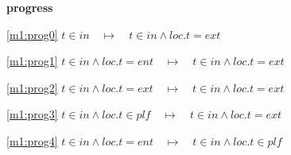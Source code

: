 \textbf{progress}
\begin{block}
\item[ \eqref{m1:prog0} ]$t \in in  \quad \mapsto\quad t \in in \land loc.t = ext $ %
\item[ \eqref{m1:prog1} ]$t \in in \land loc.t = ent  \quad \mapsto\quad t \in in \land loc.t = ext $ %
\item[ \eqref{m1:prog2} ]$t \in in \land loc.t = ext  \quad \mapsto\quad t \in in \land loc.t = ext $ %
\item[ \eqref{m1:prog3} ]$t \in in \land loc.t \in plf  \quad \mapsto\quad t \in in \land loc.t = ext $ %
\item[ \eqref{m1:prog4} ]$t \in in \land loc.t = ent  \quad \mapsto\quad t \in in \land loc.t \in plf $ %
\end{block}
